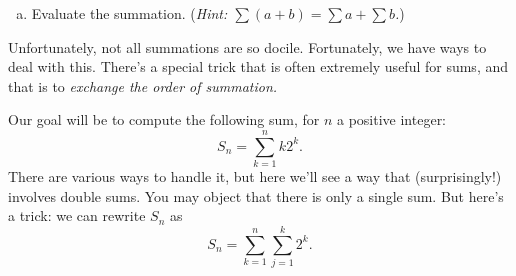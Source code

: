 \documentclass[12pt]{article}
\begin{document}
\begin{enumerate}[(a)]
\item Evaluate the summation. (\textit{Hint: $\sum(a+b)=\sum a + \sum b$.})

\end{enumerate}

Unfortunately, not all summations are so docile. Fortunately, we have
ways to deal with this. There's a special trick that is often
extremely useful for sums, and that is to \emph{exchange the order of
  summation.}  


        Our goal will be to compute the following sum, for $n$ a positive integer:
        \[ S_n = \sum_{k=1}^n k2^k. \]
    There are various ways to handle it, but here we'll see a way that (surprisingly!) involves double sums. You may object that there is only a single sum. But here's a trick: we can rewrite $S_n$ as
    \[ S_n = \sum_{k=1}^n \sum_{j=1}^k 2^k. \]
\end{document}
